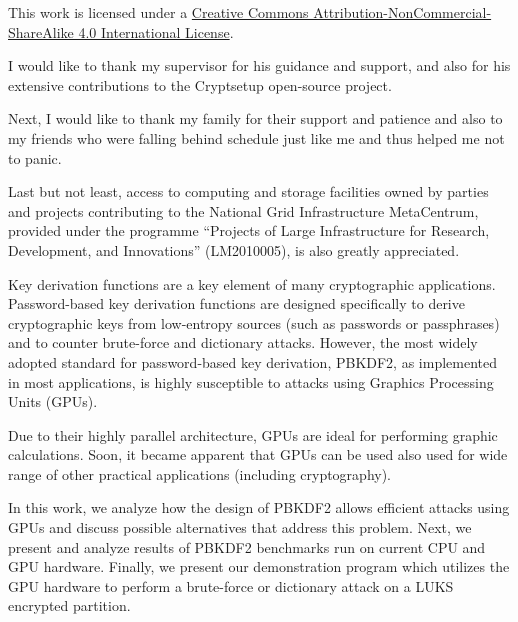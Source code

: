 \documentclass[12pt,oneside]{fithesis2}
\begin{document}
  \FrontMatter                    %
    \ThesisTitlePage                %
    
    This work is licensed under a \href{https://creativecommons.org/licenses/by-nc-sa/4.0/}{Creative Commons Attribution-NonCommercial-ShareAlike 4.0 International License}.
    \begin{center}
      \Large \ccbyncsa
    \end{center}
    
    \begin{ThesisDeclaration}       %
      \DeclarationText
      \AdvisorName
    \end{ThesisDeclaration}
    
    \begin{ThesisThanks}            %
      \sloppy
      I would like to thank my supervisor for his guidance and support, and also for his extensive contributions to the Cryptsetup open-source project.
      
      Next, I would like to thank my family for their support and patience and also to my friends who were falling behind schedule just like me and thus helped me not to panic.
      
      \sloppy
      Last but not least, access to computing and storage facilities owned by parties and projects contributing to the National Grid Infrastructure MetaCentrum, provided under the programme “Projects of Large Infrastructure for Research, Development, and Innovations” (LM2010005), is also greatly appreciated.
    \end{ThesisThanks}
    
    \begin{ThesisAbstract}          %
      Key derivation functions are a key element of many cryptographic applications. Password-based key derivation functions are designed specifically to derive cryptographic keys from low-entropy sources (such as passwords or passphrases) and to counter brute-force and dictionary attacks. However, the most widely adopted standard for password-based key derivation, PBKDF2, as implemented in most applications, is highly susceptible to attacks using Graphics Processing Units (GPUs).
      
      Due to their highly parallel architecture, GPUs are ideal for performing graphic calculations. Soon, it became apparent that GPUs can be used also used for wide range of other practical applications (including cryptography).
      
      In this work, we analyze how the design of PBKDF2 allows efficient attacks using GPUs and discuss possible alternatives that address this problem. Next, we present and analyze results of PBKDF2 benchmarks run on current CPU and GPU hardware. Finally, we present our demonstration program which utilizes the GPU hardware to perform a brute-force or dictionary attack on a LUKS encrypted partition.
    \end{ThesisAbstract}
    
\end{document}
